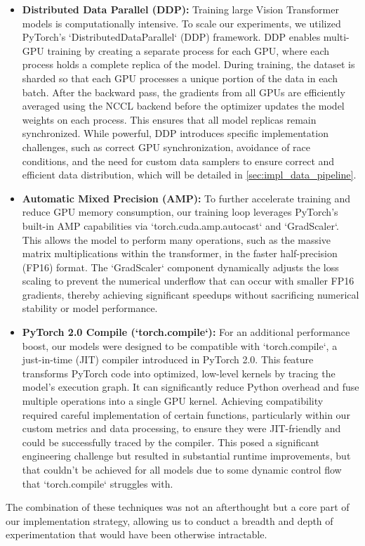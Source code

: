 \begin{itemize}
    \item \textbf{Distributed Data Parallel (DDP):} Training large Vision Transformer models is computationally intensive. To scale our experiments, we utilized PyTorch's `DistributedDataParallel` (DDP) framework. DDP enables multi-GPU training by creating a separate process for each GPU, where each process holds a complete replica of the model. During training, the dataset is sharded so that each GPU processes a unique portion of the data in each batch. After the backward pass, the gradients from all GPUs are efficiently averaged using the NCCL backend before the optimizer updates the model weights on each process. This ensures that all model replicas remain synchronized. While powerful, DDP introduces specific implementation challenges, such as correct GPU synchronization, avoidance of race conditions, and the need for custom data samplers to ensure correct and efficient data distribution, which will be detailed in \cref{sec:impl_data_pipeline}.

    \item \textbf{Automatic Mixed Precision (AMP):} To further accelerate training and reduce GPU memory consumption, our training loop leverages PyTorch's built-in AMP capabilities via `torch.cuda.amp.autocast` and `GradScaler`. This allows the model to perform many operations, such as the massive matrix multiplications within the transformer, in the faster half-precision (FP16) format. The `GradScaler` component dynamically adjusts the loss scaling to prevent the numerical underflow that can occur with smaller FP16 gradients, thereby achieving significant speedups without sacrificing numerical stability or model performance.

    \item \textbf{PyTorch 2.0 Compile (`torch.compile`):} For an additional performance boost, our models were designed to be compatible with `torch.compile`, a just-in-time (JIT) compiler introduced in PyTorch 2.0. This feature transforms PyTorch code into optimized, low-level kernels by tracing the model's execution graph. It can significantly reduce Python overhead and fuse multiple operations into a single GPU kernel. Achieving compatibility required careful implementation of certain functions, particularly within our custom metrics and data processing, to ensure they were JIT-friendly and could be successfully traced by the compiler. This posed a significant engineering challenge but resulted in substantial runtime improvements, but that couldn't be achieved for all models due to some dynamic control flow that `torch.compile` struggles with.
\end{itemize}
The combination of these techniques was not an afterthought but a core part of our implementation strategy, allowing us to conduct a breadth and depth of experimentation that would have been otherwise intractable.

